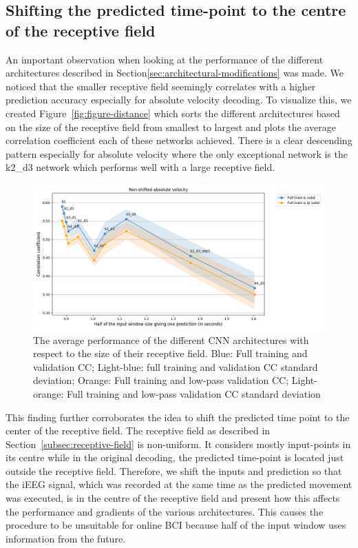 \subsection{Shifting the predicted time-point to the centre of the receptive field}\label{subsec:shifting-the-predicted-time-point-to-the-centre-of-the-receptive-field}
An important observation when looking at the performance of the different architectures described in Section\ref{sec:architectural-modifications} was made.
We noticed that the smaller receptive field seemingly correlates with a higher prediction accuracy especially for absolute velocity decoding.
To visualize this, we created Figure~\ref{fig:figure-distance} which sorts the different architectures based on the size of the receptive field from smallest to largest and plots the average correlation coefficient each of these networks achieved.
There is a clear descending pattern especially for absolute velocity where the only exceptional network is the k2\_d3 network which performs well with a large receptive field.


\begin{figure}[!htbp]
\centering
   \includegraphics[width=1\linewidth]{img/ch4/distance-shifted-performance-absVel}
   \caption{The average performance of the different CNN architectures with respect to the size of their receptive field. Blue: Full training and validation CC; Light-blue: full training and validation CC standard deviation; Orange: Full training and low-pass validation CC; Light-orange: Full training and low-pass validation CC standard deviation}
\end{figure}\label{fig:figure-distance}

This finding further corroborates the idea to shift the predicted time point to the center of the receptive field.
The receptive field as described in Section~\ref{subsec:receptive-field} is non-uniform.
It considers mostly input-points in its centre while in the original decoding, the predicted time-point is located just outside the receptive field.
Therefore, we shift the inputs and prediction so that the iEEG signal, which was recorded at the same time as the predicted movement was executed, is in the centre of the receptive field and present how this affects the performance and gradients of the various architectures.
This causes the procedure to be unsuitable for online BCI because half of the input window uses information from the future.
